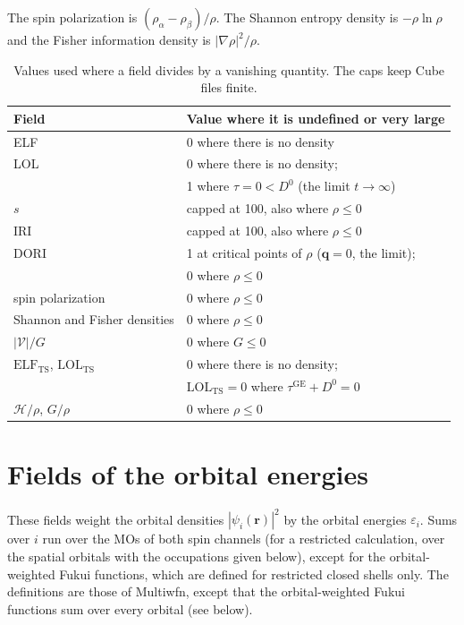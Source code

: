 \documentclass[11pt,a4paper]{article}
\begin{document}
The spin polarization is $(\rho_\alpha-\rho_\beta)/\rho$. The Shannon
entropy density is $-\rho\ln\rho$ and the Fisher information density is
$|\nabla\rho|^2/\rho$.

\begin{table}[h]
\centering
\begin{tabular}{@{}ll@{}}
\toprule
Field & Value where it is undefined or very large\\
\midrule
ELF & 0 where there is no density\\
LOL & 0 where there is no density;\\
    & 1 where $\tau=0<D^0$ (the limit $t\to\infty$)\\
$s$ & capped at 100, also where $\rho\le0$\\
IRI & capped at 100, also where $\rho\le0$\\
DORI & 1 at critical points of $\rho$ ($\mathbf q=0$, the limit);\\
     & 0 where $\rho\le0$\\
spin polarization & 0 where $\rho\le0$\\
Shannon and Fisher densities & 0 where $\rho\le0$\\
$|\mathcal V|/G$ & 0 where $G\le0$\\
$\mathrm{ELF}_{\mathrm{TS}}$, $\mathrm{LOL}_{\mathrm{TS}}$ & 0 where there is no density;\\
    & $\mathrm{LOL}_{\mathrm{TS}}=0$ where $\tau^{\mathrm{GE}}+D^0=0$\\
$\mathcal H/\rho$, $G/\rho$ & 0 where $\rho\le0$\\
\bottomrule
\end{tabular}
\caption{Values used where a field divides by a vanishing quantity. The
caps keep Cube files finite.}
\label{tab:conventions}
\end{table}

\section{Fields of the orbital energies}\label{sec:orbital-energies}

These fields weight the orbital densities $|\psi_i(\mathbf r)|^2$ by the
orbital energies $\varepsilon_i$. Sums over $i$ run over the MOs of both
spin channels (for a restricted calculation, over the spatial orbitals
with the occupations given below), except for the orbital-weighted Fukui
functions, which are defined for restricted closed shells only. The
definitions are those of Multiwfn, except that the orbital-weighted Fukui
functions sum over every orbital (see below).
\end{document}
